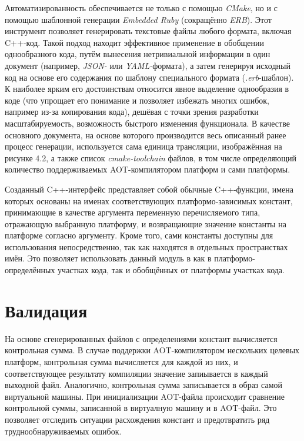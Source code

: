\par
Автоматизированность обеспечивается не только с помощью \textit{CMake}, но и с помощью шаблонной генерации \textit{Embedded Ruby} (сокращённо \textit{ERB}). Этот инструмент позволяет генерировать текстовые файлы любого формата, включая C++-код. Такой подход находит эффективное применение в обобщении однообразного кода, путём вынесения нетривиальной информации в один документ (например, \textit{JSON-} или \textit{YAML-}формата), а затем генерируя исходный код на основе его содержания по шаблону специального формата (\textit{.erb}-шаблон). К наиболее ярким его достоинствам относится явное выделение однообразия в коде (что упрощает его понимание и позволяет избежать многих ошибок, например из-за копирования кода), дешёвая с точки зрения разработки масштабируемость, возможность быстрого изменения функционала. В качестве основного документа, на основе которого производится весь описанный ранее процесс генерации, используется сама единица трансляции, изображённая на рисунке 4.2, а также список \textit{cmake-toolchain} файлов, в том числе определяющий количество поддерживаемых AOT-компилятором платформ и сами платформы.

\par
Созданный C++-интерфейс представляет собой обычные C++-функции, имена которых основаны на именах соответствующих платформо-зависимых констант, принимающие в качестве аргумента переменную перечисляемого типа, отражающую выбранную платформу, и возвращающие значение константы на платформе согласно аргументу. Кроме того, сами константы доступны для использования непосредственно, так как находятся в отдельных пространствах имён. Это позволяет использовать данный модуль в как в платформо-определённых участках кода, так и обобщённых от платформы участках кода.

\section{Валидация}
На основе сгенерированных файлов с определениями констант вычисляется контрольная сумма.
В случае поддержки AOT-компилятором нескольких целевых платформ, контрольная сумма вычисляется для каждой из них, и соответствующее результату компиляции значение запиывается в каждый выходной файл.
Аналогично, контрольная сумма записывается в образ самой виртуальной машины.
При инициализации AOT-файла происходит сравнение контрольной суммы, записанной в виртуалную машину и в AOT-файл. Это позволяет отследить ситуации расхождения констант и предотвратить ряд труднообнаруживаемых ошибок.  

\newpage